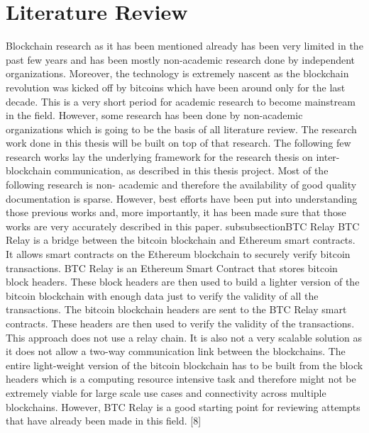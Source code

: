 \documentclass[a4paper,twoside,phd]{BYUPhys}
\begin{document}
\section{Literature Review}
Blockchain research as it has been mentioned already has been very limited in the past few years and has been mostly non-academic research done by independent organizations. Moreover, the technology is extremely nascent as the blockchain revolution was kicked off by bitcoins which have been around only for the last decade. This is a very short period for academic research to become mainstream in the field. However, some research has been done by non-academic organizations which is going to be the basis of all literature review. The research work done in this thesis will be built on top of that research. The following few research works lay the underlying framework for the research thesis on inter-blockchain communication, as described in this thesis project. Most of the following research is non- academic and therefore the availability of good quality documentation is sparse. However, best efforts have been put into understanding those previous works and, more importantly, it has been made sure that those works are very accurately described in this paper.
subsubsection{BTC Relay}
BTC Relay is a bridge between the bitcoin blockchain and Ethereum smart contracts. It allows smart contracts on the Ethereum blockchain to securely verify bitcoin transactions. BTC Relay is an Ethereum Smart Contract that stores bitcoin block headers. These block headers are then used to build a lighter version of the bitcoin blockchain with enough data just to verify the validity of all the transactions. The bitcoin blockchain headers are sent to the BTC Relay smart contracts. These headers are then used to verify the validity of the transactions. This approach does not use a relay chain. It is also not a very scalable solution as it does not allow a two-way communication link between the blockchains. The entire light-weight version of the bitcoin blockchain has to be built from the block headers which is a computing resource intensive task and therefore might not be extremely viable for large scale use cases and connectivity across multiple blockchains. However, BTC Relay is a good starting point for reviewing attempts that have already been made in this field. [8]
\end{document}
